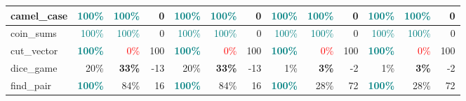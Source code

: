 \begin{table}[!h]
{\begin{tabular}{|p{2.9cm}|rr|r|rr|r||rr|r|rr|r|}
		camel\_case        & \textcolor{teal}{100\%}          & \multicolumn{1}{r|}{\textcolor{teal}{100\%}}          & \cellcolor[HTML]{FFFFFF}0   & \textcolor{teal}{100\%}          & \multicolumn{1}{r|}{\textcolor{teal}{100\%}}          & \cellcolor[HTML]{FFFFFF}0   & \textcolor{teal}{100\%}     & \multicolumn{1}{r|}{\textcolor{teal}{100\%}} & \cellcolor[HTML]{FFFFFF}0    & \textcolor{teal}{100\%}          & \multicolumn{1}{r|}{\textcolor{teal}{100\%}}          & \cellcolor[HTML]{FFFFFF}0    \\ \hline
		coin\_sums         & \textcolor{teal}{100\%}          & \multicolumn{1}{r|}{\textcolor{teal}{100\%}}          & \cellcolor[HTML]{FFFFFF}0   & \textcolor{teal}{100\%}          & \multicolumn{1}{r|}{\textcolor{teal}{100\%}}          & \cellcolor[HTML]{FFFFFF}0   & \textcolor{teal}{100\%}     & \multicolumn{1}{r|}{\textcolor{teal}{100\%}} & \cellcolor[HTML]{FFFFFF}0    & \textcolor{teal}{100\%}          & \multicolumn{1}{r|}{\textcolor{teal}{100\%}}          & \cellcolor[HTML]{FFFFFF}0    \\ \hline
		cut\_vector        & \textcolor{teal}{\textbf{100\%}} & \multicolumn{1}{r|}{\textcolor{red}{0\%}}             & \cellcolor[HTML]{FF9900}100 & \textcolor{teal}{\textbf{100\%}} & \multicolumn{1}{r|}{\textcolor{red}{0\%}}             & \cellcolor[HTML]{FF9900}100 & \textcolor{teal}{\textbf{100\%}}     & \multicolumn{1}{r|}{\textcolor{red}{0\%}}    & \cellcolor[HTML]{FF9900}100  & \textcolor{teal}{\textbf{100\%}} & \multicolumn{1}{r|}{\textcolor{red}{0\%}}             & \cellcolor[HTML]{FF9900}100  \\ \hline
		dice\_game         & 20\%                             & \multicolumn{1}{r|}{\textbf{33\%}}                    & \cellcolor[HTML]{E7EFFC}-13 & 20\%                             & \multicolumn{1}{r|}{\textbf{33\%}}                    & \cellcolor[HTML]{E7EFFC}-13 & 1\%                         & \multicolumn{1}{r|}{\textbf{3\%}}                     & \cellcolor[HTML]{FBFCFE}-2   & 1\%                              & \multicolumn{1}{r|}{\textbf{3\%}}                     & \cellcolor[HTML]{FBFCFE}-2   \\ \hline
		find\_pair         & \textcolor{teal}{\textbf{100\%}} & \multicolumn{1}{r|}{84\%}                             & \cellcolor[HTML]{FFEFD7}16  & \textcolor{teal}{\textbf{100\%}} & \multicolumn{1}{r|}{84\%}                             & \cellcolor[HTML]{FFEFD7}16  & \textcolor{teal}{\textbf{100\%}}     & \multicolumn{1}{r|}{28\%}                    & \cellcolor[HTML]{FFB648}72   & \textcolor{teal}{\textbf{100\%}} & \multicolumn{1}{r|}{28\%}                             & \cellcolor[HTML]{FFB648}72   \\ \hline

\end{tabular}}
\end{table}
